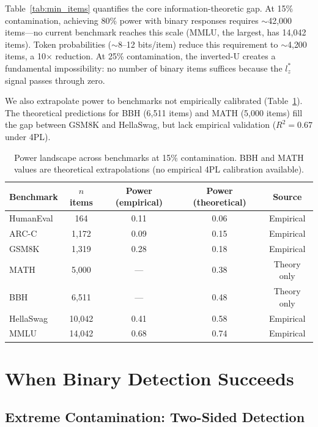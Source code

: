 \documentclass[11pt,a4paper]{article}
\newcommand{\lzstar}{$l_{z}^{*}$}
\begin{document}
Table~\ref{tab:min_items} quantifies the core information-theoretic gap. At 15\% contamination, achieving 80\% power with binary responses requires $\sim$42{,}000 items---no current benchmark reaches this scale (MMLU, the largest, has 14{,}042 items). Token probabilities ($\sim$8--12 bits/item) reduce this requirement to $\sim$4{,}200 items, a 10$\times$ reduction. At 25\% contamination, the inverted-U creates a fundamental impossibility: no number of binary items suffices because the \lzstar{} signal passes through zero.

We also extrapolate power to benchmarks not empirically calibrated (Table~\ref{tab:power_landscape}). The theoretical predictions for BBH (6{,}511 items) and MATH (5{,}000 items) fill the gap between GSM8K and HellaSwag, but lack empirical validation ($R^2 = 0.67$ under 4PL).

\begin{table}[t]
\centering
\caption{Power landscape across benchmarks at 15\% contamination. BBH and MATH values are theoretical extrapolations (no empirical 4PL calibration available).}
\label{tab:power_landscape}
\small
\begin{tabular}{@{}lcccc@{}}
\toprule
Benchmark & $n$ items & Power (empirical) & Power (theoretical) & Source \\
\midrule
HumanEval & 164 & 0.11 & 0.06 & Empirical \\
ARC-C & 1{,}172 & 0.09 & 0.15 & Empirical \\
GSM8K & 1{,}319 & 0.28 & 0.18 & Empirical \\
MATH & 5{,}000 & --- & 0.38 & Theory only \\
BBH & 6{,}511 & --- & 0.48 & Theory only \\
HellaSwag & 10{,}042 & 0.41 & 0.58 & Empirical \\
MMLU & 14{,}042 & 0.68 & 0.74 & Empirical \\
\bottomrule
\end{tabular}
\end{table}

\section{When Binary Detection Succeeds}

\subsection{Extreme Contamination: Two-Sided Detection}
\label{sec:twosided}
\end{document}
